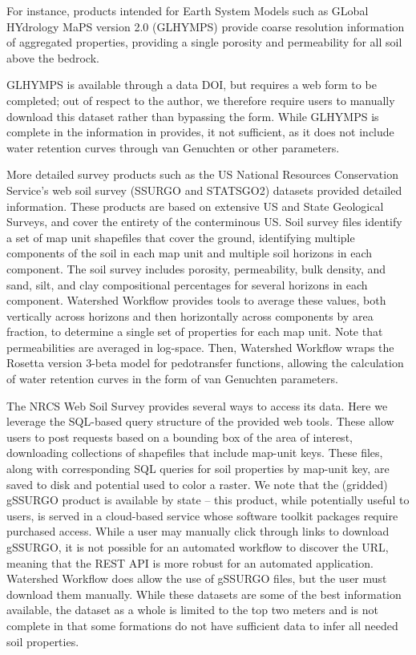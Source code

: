 \documentclass[a4paper,fleqn]{cas-dc}
\newcommand{\note}[1]{\emph{\color{red}{#1}}}
\begin{document}
For instance, products intended for Earth System Models such as GLobal HYdrology MaPS version 2.0 (GLHYMPS)\cite{huscroft2018compiling} provide coarse resolution information of aggregated properties, providing a single porosity and permeability for all soil above the bedrock.
\note{GLHYMPS description sentence, what is it, etc.}

GLHYMPS is available through a data DOI\cite{}, but requires a web form to be completed; out of respect to the author, we therefore require users to manually download this dataset rather than bypassing the form.
While GLHYMPS is complete in the information in provides, it not sufficient, as it does not include water retention curves through van Genuchten or other parameters.

More detailed survey products such as the US National Resources Conservation Service's web soil survey (SSURGO and STATSGO2) datasets provided detailed information.
These products are based on extensive US and State Geological Surveys, and cover the entirety of the conterminous US.
Soil survey files identify a set of map unit shapefiles that cover the ground, identifying multiple components of the soil in each map unit and multiple soil horizons in each component.
The soil survey includes porosity, permeability, bulk density, and sand, silt, and clay compositional percentages for several horizons in each component.
Watershed Workflow provides tools to average these values, both vertically across horizons and then horizontally across components by area fraction, to determine a single set of properties for each map unit.
Note that permeabilities are averaged in log-space.
Then, Watershed Workflow wraps the Rosetta version 3-beta\cite{} model for pedotransfer functions, allowing the calculation of water retention curves in the form of van Genuchten parameters\cite{}.

The NRCS Web Soil Survey provides several ways to access its data.
Here we leverage the SQL-based query structure of the provided web tools\cite{}.
These allow users to post requests based on a bounding box of the area of interest, downloading collections of shapefiles that include map-unit keys.
These files, along with corresponding SQL queries for soil properties by map-unit key, are saved to disk and potential used to color a raster.
We note that the (gridded) gSSURGO product is available by state -- this product, while potentially useful to users, is served in a cloud-based service whose software toolkit packages require purchased access.
While a user may manually click through links to download gSSURGO, it is not possible for an automated workflow to discover the URL, meaning that the REST API is more robust for an automated application.
Watershed Workflow does allow the use of gSSURGO files, but the user must download them manually.
While these datasets are some of the best information available, the dataset as a whole is limited to the top two meters and is not complete in that some formations do not have sufficient data to infer all needed soil properties.
\end{document}
